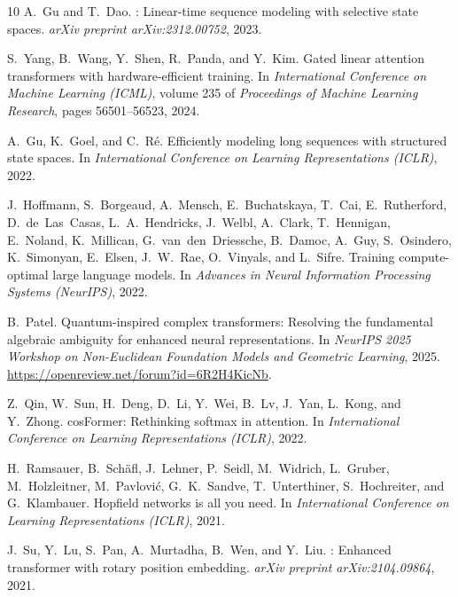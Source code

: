 \documentclass{article}
\begin{document}
\begin{thebibliography}{10}
A.~Gu and T.~Dao.
: Linear-time sequence modeling with selective state spaces.
\newblock \emph{arXiv preprint arXiv:2312.00752}, 2023.

S.~Yang, B.~Wang, Y.~Shen, R.~Panda, and Y.~Kim.
\newblock Gated linear attention transformers with hardware-efficient training.
\newblock In \emph{International Conference on Machine Learning (ICML)}, volume 235 of \emph{Proceedings of Machine Learning Research}, pages 56501--56523, 2024.

A.~Gu, K.~Goel, and C.~R\'{e}.
\newblock Efficiently modeling long sequences with structured state spaces.
\newblock In \emph{International Conference on Learning Representations (ICLR)}, 2022.

J.~Hoffmann, S.~Borgeaud, A.~Mensch, E.~Buchatskaya, T.~Cai, E.~Rutherford, D.~de~Las~Casas, L.~A.~Hendricks, J.~Welbl, A.~Clark, T.~Hennigan, E.~Noland, K.~Millican, G.~van~den~Driessche, B.~Damoc, A.~Guy, S.~Osindero, K.~Simonyan, E.~Elsen, J.~W.~Rae, O.~Vinyals, and L.~Sifre.
\newblock Training compute-optimal large language models.
\newblock In \emph{Advances in Neural Information Processing Systems (NeurIPS)}, 2022.

B.~Patel.
\newblock Quantum-inspired complex transformers: Resolving the fundamental algebraic ambiguity for enhanced neural representations.
\newblock In \emph{NeurIPS 2025 Workshop on Non-Euclidean Foundation Models and Geometric Learning}, 2025.
\newblock \url{https://openreview.net/forum?id=6R2H4KicNb}.

Z.~Qin, W.~Sun, H.~Deng, D.~Li, Y.~Wei, B.~Lv, J.~Yan, L.~Kong, and Y.~Zhong.
\newblock cos{F}ormer: Rethinking softmax in attention.
\newblock In \emph{International Conference on Learning Representations (ICLR)}, 2022.

H.~Ramsauer, B.~Sch{\"a}fl, J.~Lehner, P.~Seidl, M.~Widrich, L.~Gruber, M.~Holzleitner, M.~Pavlovi{\'c}, G.~K.~Sandve, T.~Unterthiner, S.~Hochreiter, and G.~Klambauer.
\newblock Hopfield networks is all you need.
\newblock In \emph{International Conference on Learning Representations (ICLR)}, 2021.

J.~Su, Y.~Lu, S.~Pan, A.~Murtadha, B.~Wen, and Y.~Liu.
: Enhanced transformer with rotary position embedding.
\newblock \emph{arXiv preprint arXiv:2104.09864}, 2021.


\end{thebibliography}
\end{document}
